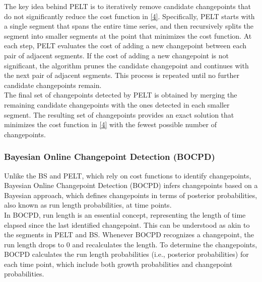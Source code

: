 \documentclass[]{interact}
\theoremstyle{plain}%
\theoremstyle{definition}
\theoremstyle{remark}
\begin{document}
{	The key idea behind PELT is to iteratively remove candidate changepoints that do not significantly reduce the cost function in \autoref{4}. Specifically, PELT starts with a single segment that spans the entire time series, and then recursively splits the segment into smaller segments at the point that minimizes the cost function\cite{chapmanMetaAnalysisMetricsChange}. At each step, PELT evaluates the cost of adding a new changepoint between each pair of adjacent segments. If the cost of adding a new changepoint is not significant, the algorithm prunes the candidate changepoint and continues with the next pair of adjacent segments. This process is repeated until no further candidate changepoints remain. \\
	
	The final set of changepoints detected by PELT is obtained by merging the remaining candidate changepoints with the ones detected in each smaller segment. The resulting set of changepoints provides an exact solution that minimizes the cost function in \autoref{4} with the fewest possible number of changepoints.
	
	\subsubsection{Bayesian Online Changepoint Detection (BOCPD)} \label{sec:BOCPD}
	
	
	\hspace{0.27cm} Unlike the BS and PELT, which rely on cost functions to identify changepoints, Bayesian Online Changepoint Detection (BOCPD) infers changepoints based on a Bayesian approach, which defines changepoints in terms of posterior probabilities, also known as run length probabilities, at time points. \\
	
	In BOCPD, run length is an essential concept, representing the length of time elapsed since the last identified changepoint. This can be understood as akin to the segments in PELT and BS. Whenever BOCPD recognizes a changepoint, the run length drops to 0 and recalculates the length. To determine the changepoints, BOCPD calculates the run length probabilities (i.e., posterior probabilities) for each time point, which include both growth probabilities and changepoint probabilities. \\
	
}
\end{document}
